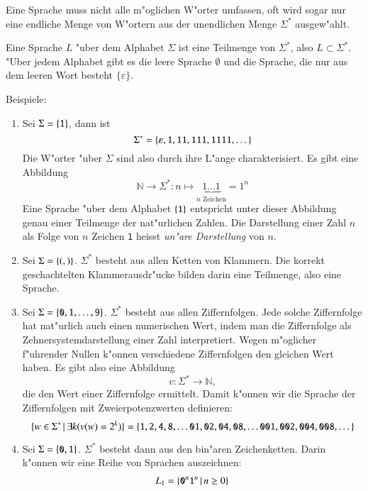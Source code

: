 Eine Sprache muss nicht alle m"oglichen W"orter umfassen, oft wird sogar
nur eine endliche Menge von W"ortern aus der unendlichen Menge $\Sigma^*$
ausgew"ahlt.

\begin{definition}
Eine Sprache $L$ "uber dem Alphabet $\Sigma$ ist eine Teilmenge
von $\Sigma^*$, also $L\subset \Sigma^*$. "Uber jedem Alphabet
gibt es die leere Sprache $\emptyset$ und die Sprache, die nur
aus dem leeren Wort besteht $\{\varepsilon\}$.
\end{definition}

{\parindent0pt Beispiele:}
\begin{enumerate}
\item Sei $\Sigma=\{{\tt 1}\}$, dann ist
\[
\Sigma^*=\{\varepsilon, {\tt 1}, {\tt 11}, {\tt 111}, {\tt 1111},\dots\}
\]
Die W"orter "uber $\Sigma$ sind also durch ihre L"ange charakterisiert.
Es gibt eine Abbildung
\[
\mathbb N\to\Sigma^*\colon n\mapsto \underbrace{1\dots 1}_{\text{$n$ Zeichen}}=1^n
\]
Eine Sprache "uber dem Alphabet $\{{\tt 1}\}$ entspricht unter dieser
Abbildung genau einer Teilmenge der nat"urlichen Zahlen. Die Darstellung
einer Zahl $n$ als Folge von $n$ Zeichen {\tt 1} heisst
{\em un"are Darstellung}
von $n$.
\item Sei $\Sigma=\{{\tt (}, {\tt )}\}$. $\Sigma^*$ besteht aus allen
Ketten von Klammern. Die korrekt geschachtelten Klammerausdr"ucke bilden
darin eine Teilmenge, also eine Sprache.
\item Sei $\Sigma=\{{\tt 0},{\tt 1},\dots,{\tt 9}\}$. $\Sigma^*$ besteht
aus allen Ziffernfolgen. Jede solche Ziffernfolge hat nat"urlich auch
einen numerischen Wert, indem man die Ziffernfolge als Zehnersystemdarstellung
einer Zahl interpretiert. Wegen m"oglicher f"uhrender Nullen k"onnen verschiedene
Ziffernfolgen den gleichen Wert haben. Es gibt also eine Abbildung
\[
v\colon\Sigma^*\to \mathbb N,
\]
die den Wert einer Ziffernfolge ermittelt. Damit k"onnen wir die Sprache
der Ziffernfolgen mit Zweierpotenzwerten definieren:
\[
\{w\in\Sigma^*\,|\, \exists k (v(w)=2^k)\}=\{
{\tt 1},
{\tt 2},
{\tt 4},
{\tt 8},\dots
{\tt 01},
{\tt 02},
{\tt 04},
{\tt 08},\dots
{\tt 001},
{\tt 002},
{\tt 004},
{\tt 008},\dots\}
\]
\item Sei $\Sigma=\{{\tt 0}, {\tt 1}\}$. $\Sigma^*$ besteht dann aus den
bin"aren Zeichenketten. Darin k"onnen wir eine Reihe von Sprachen auszeichnen:
\begin{align*}
L_1&=\{ {\tt 0}^n{\tt 1}^n\,|\,n\ge 0\}\\

\end{align*}
\end{enumerate}
